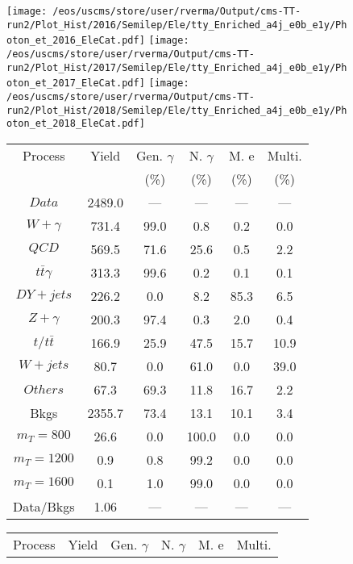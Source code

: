 \begin{figure}
\centering
\texttt{[image: /eos/uscms/store/user/rverma/Output/cms-TT-run2/Plot\_Hist/2016/Semilep/Ele/tty\_Enriched\_a4j\_e0b\_e1y/Photon\_et\_2016\_EleCat.pdf]}
\texttt{[image: /eos/uscms/store/user/rverma/Output/cms-TT-run2/Plot\_Hist/2017/Semilep/Ele/tty\_Enriched\_a4j\_e0b\_e1y/Photon\_et\_2017\_EleCat.pdf]}
\texttt{[image: /eos/uscms/store/user/rverma/Output/cms-TT-run2/Plot\_Hist/2018/Semilep/Ele/tty\_Enriched\_a4j\_e0b\_e1y/Photon\_et\_2018\_EleCat.pdf]}
\begin{minipage}[c]{0.32\textwidth}
\centering
\tiny{
\begin{tabular}{cccccc}
\hline
Process & Yield & Gen. $\gamma$ & N. $\gamma$ & M. e & Multi. \\
 &  & (\%) & (\%) & (\%) & (\%)  \\
\hline
                                                                      $ Data $ &  2489.0 &  --- &  --- &  --- &  ---\\
$ W+\gamma $ &  731.4 &  99.0 &  0.8 &  0.2 &  0.0\\
$ QCD $ &  569.5 &  71.6 &  25.6 &  0.5 &  2.2\\
$ t\bar{t}\gamma $ &  313.3 &  99.6 &  0.2 &  0.1 &  0.1\\
$ DY+jets $ &  226.2 &  0.0 &  8.2 &  85.3 &  6.5\\
$ Z+\gamma $ &  200.3 &  97.4 &  0.3 &  2.0 &  0.4\\
$ t/t\bar{t} $ &  166.9 &  25.9 &  47.5 &  15.7 &  10.9\\
$ W+jets $ &  80.7 &  0.0 &  61.0 &  0.0 &  39.0\\
$ Others $ &  67.3 &  69.3 &  11.8 &  16.7 &  2.2\\
Bkgs &  2355.7 &  73.4 &  13.1 &  10.1 &  3.4\\
$ m_{T} = 800 $ &  26.6 &  0.0 &  100.0 &  0.0 &  0.0\\
$ m_{T} = 1200 $ &  0.9 &  0.8 &  99.2 &  0.0 &  0.0\\
$ m_{T} = 1600 $ &  0.1 &  1.0 &  99.0 &  0.0 &  0.0\\
Data/Bkgs &  1.06 &  --- &  --- &  --- &  ---\\
\hline
\end{tabular}
}
\end{minipage}
\begin{minipage}[c]{0.32\textwidth}
\centering
\tiny{
\begin{tabular}{cccccc}
\hline
Process & Yield & Gen. $\gamma$ & N. $\gamma$ & M. e & Multi. \\

\end{tabular}}
\end{minipage}
\end{figure}
